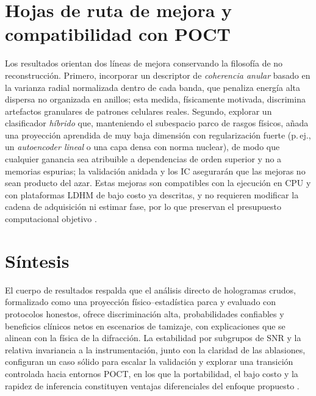 \section*{Hojas de ruta de mejora y compatibilidad con POCT}
Los resultados orientan dos líneas de mejora conservando la filosofía de no reconstrucción. Primero, incorporar un descriptor de \emph{coherencia anular} basado en la varianza radial normalizada dentro de cada banda, que penaliza energía alta dispersa no organizada en anillos; esta medida, físicamente motivada, discrimina artefactos granulares de patrones celulares reales. Segundo, explorar un clasificador \emph{híbrido} que, manteniendo el subespacio parco de rasgos físicos, añada una proyección aprendida de muy baja dimensión con regularización fuerte (p.\,ej., un \emph{autoencoder lineal} o una capa densa con norma nuclear), de modo que cualquier ganancia sea atribuible a dependencias de orden superior y no a memorias espurias; la validación anidada y los IC asegurarán que las mejoras no sean producto del azar. Estas mejoras son compatibles con la ejecución en CPU y con plataformas LDHM de bajo costo ya descritas, y no requieren modificar la cadena de adquisición ni estimar fase, por lo que preservan el presupuesto computacional objetivo \cite{Greenbaum2014STM,Chen2022Photonics}.

\section*{Síntesis}
El cuerpo de resultados respalda que el análisis directo de hologramas crudos, formalizado como una proyección físico–estadística parca y evaluado con protocolos honestos, ofrece discriminación alta, probabilidades confiables y beneficios clínicos netos en escenarios de tamizaje, con explicaciones que se alinean con la física de la difracción. La estabilidad por subgrupos de SNR y la relativa invariancia a la instrumentación, junto con la claridad de las ablasiones, configuran un caso sólido para escalar la validación y explorar una transición controlada hacia entornos POCT, en los que la portabilidad, el bajo costo y la rapidez de inferencia constituyen ventajas diferenciales del enfoque propuesto \cite{Tsamardinos2022Patterns,Kiani2022TextureSurvey,Vickers2006MedDec,Greenbaum2014STM,Chen2022Photonics}.
